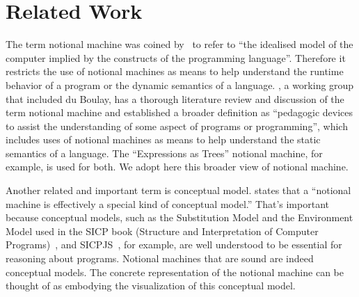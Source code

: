 
\section{Related Work}
\label{sec:RelatedWork}


The term notional machine
was coined by~\citet{duboulayDifficultiesLearningProgram1986} to refer to
``the idealised model of the computer implied by the constructs of the programming language''.
Therefore it
restricts the use of notional machines as means to help understand the runtime behavior of a program or the dynamic semantics of a language.
\citet{fincherNotionalMachinesComputing2020}, a working group that included du Boulay,
has a thorough literature review and discussion of the term notional machine
and
established a broader definition
as
``pedagogic devices to assist the understanding of some aspect of programs or programming'',
which includes
uses of notional machines as means to help understand the static semantics of a language.
The ``Expressions as Trees'' notional machine,
for example,
is used for both.
We adopt here this broader view of notional machine.

Another related and important term is conceptual model.
\citet{fincherNotionalMachinesComputing2020} states that a
``notional machine is effectively a special kind of conceptual model.''
That's important because
conceptual models,
such as the Substitution Model and the Environment Model used
in the SICP book (Structure and Interpretation of Computer Programs)~\cite{abelsonStructureInterpretationComputer1996},
and SICPJS~\cite{abelsonStructureInterpretationComputer2022},
for example,
are well understood to be essential for reasoning about programs.
Notional machines that are sound are indeed conceptual models.
The concrete representation of the notional machine
can be thought of as embodying the visualization of this conceptual model.

